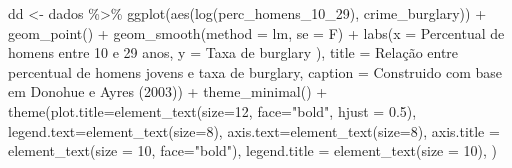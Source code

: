 \documentclass[
]{article}
\newenvironment{Shaded}{\begin{snugshade}}{\end{snugshade}}
\newcommand{\AttributeTok}[1]{\textcolor[rgb]{0.77,0.63,0.00}{#1}}
\newcommand{\DecValTok}[1]{\textcolor[rgb]{0.00,0.00,0.81}{#1}}
\newcommand{\FloatTok}[1]{\textcolor[rgb]{0.00,0.00,0.81}{#1}}
\newcommand{\FunctionTok}[1]{\textcolor[rgb]{0.00,0.00,0.00}{#1}}
\newcommand{\NormalTok}[1]{#1}
\newcommand{\OtherTok}[1]{\textcolor[rgb]{0.56,0.35,0.01}{#1}}
\newcommand{\SpecialCharTok}[1]{\textcolor[rgb]{0.00,0.00,0.00}{#1}}
\newcommand{\StringTok}[1]{\textcolor[rgb]{0.31,0.60,0.02}{#1}}
\begin{document}
\begin{Shaded}
\begin{Highlighting}[]
\NormalTok{dd }\OtherTok{\textless{}{-}}\NormalTok{ dados }\SpecialCharTok{\%\textgreater{}\%} 
  \FunctionTok{ggplot}\NormalTok{(}\FunctionTok{aes}\NormalTok{(}\FunctionTok{log}\NormalTok{(perc\_homens\_10\_29), crime\_burglary)) }\SpecialCharTok{+}
  \FunctionTok{geom\_point}\NormalTok{() }\SpecialCharTok{+} 
  \FunctionTok{geom\_smooth}\NormalTok{(}\AttributeTok{method =} \StringTok{\textquotesingle{}lm\textquotesingle{}}\NormalTok{, }\AttributeTok{se =}\NormalTok{ F) }\SpecialCharTok{+}
  \FunctionTok{labs}\NormalTok{(}\AttributeTok{x =} \StringTok{\textquotesingle{}Percentual de homens entre 10 e 29 anos\textquotesingle{}}\NormalTok{,}
       \AttributeTok{y =} \StringTok{\textquotesingle{}Taxa de burglary )\textquotesingle{}}\NormalTok{,}
       \AttributeTok{title =} \StringTok{\textquotesingle{}Relação entre percentual de homens jovens e taxa de burglary\textquotesingle{}}\NormalTok{,}
       \AttributeTok{caption =} \StringTok{\textquotesingle{}Construido com base em Donohue e Ayres (2003)\textquotesingle{}}\NormalTok{) }\SpecialCharTok{+} 
  \FunctionTok{theme\_minimal}\NormalTok{() }\SpecialCharTok{+}
  \FunctionTok{theme}\NormalTok{(}\AttributeTok{plot.title=}\FunctionTok{element\_text}\NormalTok{(}\AttributeTok{size=}\DecValTok{12}\NormalTok{, }\AttributeTok{face=}\StringTok{"bold"}\NormalTok{, }\AttributeTok{hjust =} \FloatTok{0.5}\NormalTok{),}
        \AttributeTok{legend.text=}\FunctionTok{element\_text}\NormalTok{(}\AttributeTok{size=}\DecValTok{8}\NormalTok{),}
        \AttributeTok{axis.text=}\FunctionTok{element\_text}\NormalTok{(}\AttributeTok{size=}\DecValTok{8}\NormalTok{),}
        \AttributeTok{axis.title =} \FunctionTok{element\_text}\NormalTok{(}\AttributeTok{size =} \DecValTok{10}\NormalTok{, }\AttributeTok{face=}\StringTok{"bold"}\NormalTok{),}
        \AttributeTok{legend.title =} \FunctionTok{element\_text}\NormalTok{(}\AttributeTok{size =} \DecValTok{10}\NormalTok{),}
\NormalTok{  )}


\end{Highlighting}
\end{Shaded}
\end{document}
